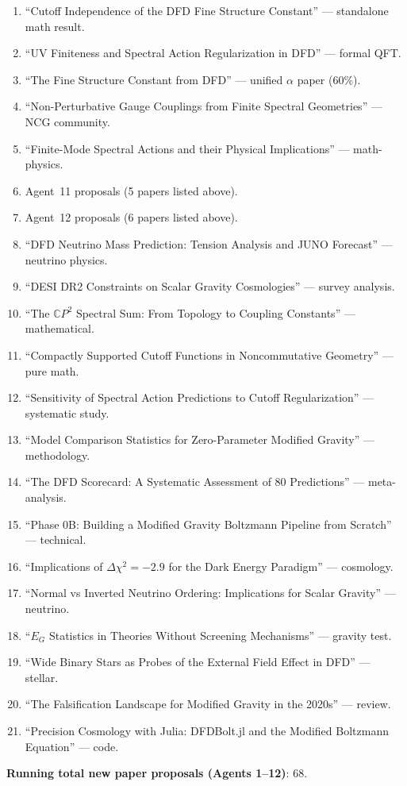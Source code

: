 \documentclass[11pt,a4paper]{article}
\newcommand{\CP}{\mathbb{C}P}
\begin{document}
\begin{enumerate}
\item ``Cutoff Independence of the DFD Fine Structure Constant'' --- standalone math result.
\item ``UV Finiteness and Spectral Action Regularization in DFD'' --- formal QFT.
\item ``The Fine Structure Constant from DFD'' --- unified $\alpha$ paper (60\%).
\item ``Non-Perturbative Gauge Couplings from Finite Spectral Geometries'' --- NCG community.
\item ``Finite-Mode Spectral Actions and their Physical Implications'' --- math-physics.
\item Agent~11 proposals (5 papers listed above).
\item Agent~12 proposals (6 papers listed above).
\item ``DFD Neutrino Mass Prediction: Tension Analysis and JUNO Forecast'' --- neutrino physics.
\item ``DESI DR2 Constraints on Scalar Gravity Cosmologies'' --- survey analysis.
\item ``The $\CP^2$ Spectral Sum: From Topology to Coupling Constants'' --- mathematical.
\item ``Compactly Supported Cutoff Functions in Noncommutative Geometry'' --- pure math.
\item ``Sensitivity of Spectral Action Predictions to Cutoff Regularization'' --- systematic study.
\item ``Model Comparison Statistics for Zero-Parameter Modified Gravity'' --- methodology.
\item ``The DFD Scorecard: A Systematic Assessment of 80 Predictions'' --- meta-analysis.
\item ``Phase 0B: Building a Modified Gravity Boltzmann Pipeline from Scratch'' --- technical.
\item ``Implications of $\Delta\chi^2 = -2.9$ for the Dark Energy Paradigm'' --- cosmology.
\item ``Normal vs Inverted Neutrino Ordering: Implications for Scalar Gravity'' --- neutrino.
\item ``$E_G$ Statistics in Theories Without Screening Mechanisms'' --- gravity test.
\item ``Wide Binary Stars as Probes of the External Field Effect in DFD'' --- stellar.
\item ``The Falsification Landscape for Modified Gravity in the 2020s'' --- review.
\item ``Precision Cosmology with Julia: DFDBolt.jl and the Modified Boltzmann Equation'' --- code.
\end{enumerate}

\textbf{Running total new paper proposals (Agents 1--12)}: 68.
\end{document}
